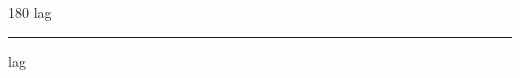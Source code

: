 
\begin{frame}
\begin{center}
\begin{turn}{180}
{\fontsize{2.5cm}{1em}\selectfont lag}
\end{turn}
\vspace{1em}\par  
\hrule
\vspace{1em}\par  
{\fontsize{2.5cm}{1em}\selectfont lag}
\end{center}
\end{frame}
